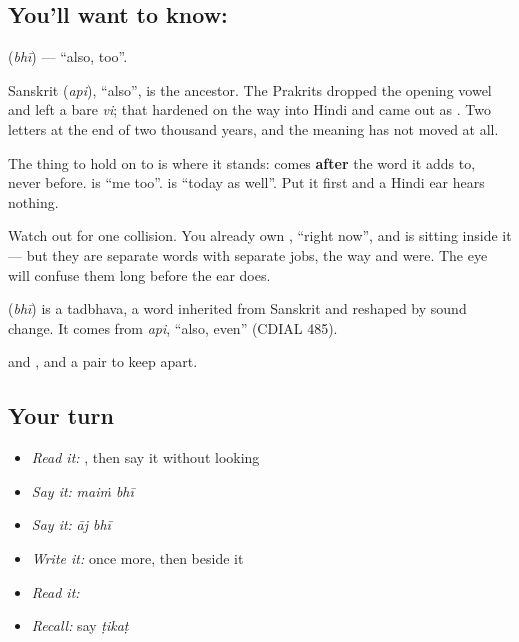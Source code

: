 \subsection*{You'll want to know: }
\textbf{} (\emph{bhī}) — \textquotedblleft{}also, too\textquotedblright{}.

Sanskrit  (\emph{api}), \textquotedblleft{}also\textquotedblright{}, is the ancestor. The Prakrits dropped the opening vowel and left a bare \emph{vi}; that hardened on the way into Hindi and came out as . Two letters at the end of two thousand years, and the meaning has not moved at all.

The thing to hold on to is where it stands:  comes \textbf{after} the word it adds to, never before. \textbf{ } is \textquotedblleft{}me too\textquotedblright{}. \textbf{ } is \textquotedblleft{}today as well\textquotedblright{}. Put it first and a Hindi ear hears nothing.

Watch out for one collision. You already own \textbf{}, \textquotedblleft{}right now\textquotedblright{}, and  is sitting inside it — but they are separate words with separate jobs, the way \textbf{} and \textbf{} were. The eye will confuse them long before the ear does.

\begin{cousinweb}
\textbf{} (\emph{bhī}) is a tadbhava, a word inherited from Sanskrit and reshaped by sound change. It comes from \emph{api}, \textquotedblleft{}also, even\textquotedblright{} (CDIAL 485).
\end{cousinweb}

\begin{grammarlens}[title={What you've built}]
 and , and a pair to keep apart.
\end{grammarlens}

\subsection*{Your turn}
\begin{itemize}
\raggedright
  \item \emph{Read it:} \textbf{}, then say it without looking
  \item \emph{Say it:} \emph{maiṁ bhī}
  \item \emph{Say it:} \emph{āj bhī}
  \item \emph{Write it:}  once more, then  beside it
  \item \emph{Read it:} \textbf{}
  \item \emph{Recall:} say \emph{ṭikaṭ}
\end{itemize}

